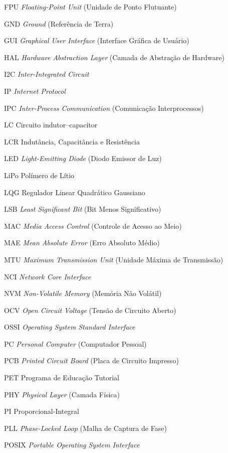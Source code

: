\begin{siglas}
	\item[FPU] \textit{Floating-Point Unit} (Unidade de Ponto Flutuante)
	\item[GND] \textit{Ground} (Referência de Terra)
	\item[GUI] \textit{Graphical User Interface} (Interface Gráfica de Usuário)
	\item[HAL] \textit{Hardware Abstraction Layer} (Camada de Abstração de Hardware)
	\item[I2C] \textit{Inter-Integrated Circuit}
	\item[IP] \textit{Internet Protocol}
	\item[IPC] \textit{Inter-Process Communication} (Comunicação Interprocessos)
	\item[LC] Circuito indutor--capacitor
	\item[LCR] Indutância, Capacitância e Resistência
	\item[LED] \textit{Light-Emitting Diode} (Diodo Emissor de Luz)
	\item[LiPo] Polímero de Lítio
	\item[LQG] Regulador Linear Quadrático Gaussiano
	\item[LSB] \textit{Least Significant Bit} (Bit Menos Significativo)
	\item[MAC] \textit{Media Access Control} (Controle de Acesso ao Meio)
	\item[MAE] \textit{Mean Absolute Error} (Erro Absoluto Médio)
	\item[MTU] \textit{Maximum Transmission Unit} (Unidade Máxima de Transmissão)
	\item[NCI] \textit{Network Core Interface}
	\item[NVM] \textit{Non-Volatile Memory} (Memória Não Volátil)
	\item[OCV] \textit{Open Circuit Voltage} (Tensão de Circuito Aberto)
	\item[OSSI] \textit{Operating System Standard Interface}
	\item[PC] \textit{Personal Computer} (Computador Pessoal)
	\item[PCB] \textit{Printed Circuit Board} (Placa de Circuito Impresso)
	\item[PET] Programa de Educação Tutorial
	\item[PHY] \textit{Physical Layer} (Camada Física)
	\item[PI] Proporcional-Integral
	\item[PLL] \textit{Phase-Locked Loop} (Malha de Captura de Fase)
	\item[POSIX] \textit{Portable Operating System Interface}

\end{siglas}
